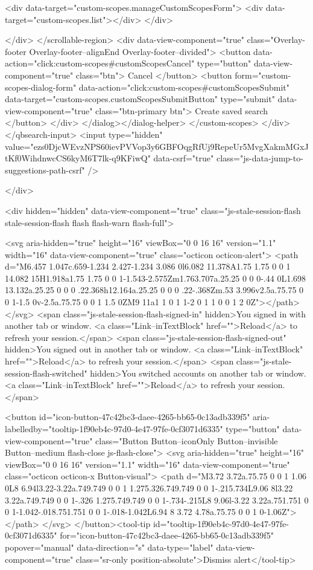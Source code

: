{{        <div data-target="custom-scopes.manageCustomScopesForm">
          <div data-target="custom-scopes.list"></div>
        </div>

</div>
      </scrollable-region>
      <div data-view-component="true" class="Overlay-footer Overlay-footer--alignEnd Overlay-footer--divided">          <button data-action="click:custom-scopes#customScopesCancel" type="button" data-view-component="true" class="btn">    Cancel
</button>
          <button form="custom-scopes-dialog-form" data-action="click:custom-scopes#customScopesSubmit" data-target="custom-scopes.customScopesSubmitButton" type="submit" data-view-component="true" class="btn-primary btn">    Create saved search
</button>
</div>
</dialog></dialog-helper>
    </custom-scopes>
  </div>
</qbsearch-input>  <input type="hidden" value="ezs0DjcWEvzNPS60ievPVVop3y6GBFOqgRfUj9RepeUr5MvgXakmMGxJtKf0WihdnwcCS6kyM6T7lk-q9KFiwQ" data-csrf="true" class="js-data-jump-to-suggestions-path-csrf" />


      </div>


      <div hidden="hidden" data-view-component="true" class="js-stale-session-flash stale-session-flash flash flash-warn flash-full">
  
        <svg aria-hidden="true" height="16" viewBox="0 0 16 16" version="1.1" width="16" data-view-component="true" class="octicon octicon-alert">
    <path d="M6.457 1.047c.659-1.234 2.427-1.234 3.086 0l6.082 11.378A1.75 1.75 0 0 1 14.082 15H1.918a1.75 1.75 0 0 1-1.543-2.575Zm1.763.707a.25.25 0 0 0-.44 0L1.698 13.132a.25.25 0 0 0 .22.368h12.164a.25.25 0 0 0 .22-.368Zm.53 3.996v2.5a.75.75 0 0 1-1.5 0v-2.5a.75.75 0 0 1 1.5 0ZM9 11a1 1 0 1 1-2 0 1 1 0 0 1 2 0Z"></path>
</svg>
        <span class="js-stale-session-flash-signed-in" hidden>You signed in with another tab or window. <a class="Link--inTextBlock" href="">Reload</a> to refresh your session.</span>
        <span class="js-stale-session-flash-signed-out" hidden>You signed out in another tab or window. <a class="Link--inTextBlock" href="">Reload</a> to refresh your session.</span>
        <span class="js-stale-session-flash-switched" hidden>You switched accounts on another tab or window. <a class="Link--inTextBlock" href="">Reload</a> to refresh your session.</span>

    <button id="icon-button-47c42bc3-daee-4265-bb65-0c13adb339f5" aria-labelledby="tooltip-1f90eb4c-97d0-4e47-97fe-0cf3071d6335" type="button" data-view-component="true" class="Button Button--iconOnly Button--invisible Button--medium flash-close js-flash-close">  <svg aria-hidden="true" height="16" viewBox="0 0 16 16" version="1.1" width="16" data-view-component="true" class="octicon octicon-x Button-visual">
    <path d="M3.72 3.72a.75.75 0 0 1 1.06 0L8 6.94l3.22-3.22a.749.749 0 0 1 1.275.326.749.749 0 0 1-.215.734L9.06 8l3.22 3.22a.749.749 0 0 1-.326 1.275.749.749 0 0 1-.734-.215L8 9.06l-3.22 3.22a.751.751 0 0 1-1.042-.018.751.751 0 0 1-.018-1.042L6.94 8 3.72 4.78a.75.75 0 0 1 0-1.06Z"></path>
</svg>
</button><tool-tip id="tooltip-1f90eb4c-97d0-4e47-97fe-0cf3071d6335" for="icon-button-47c42bc3-daee-4265-bb65-0c13adb339f5" popover="manual" data-direction="s" data-type="label" data-view-component="true" class="sr-only position-absolute">Dismiss alert</tool-tip>


}}

